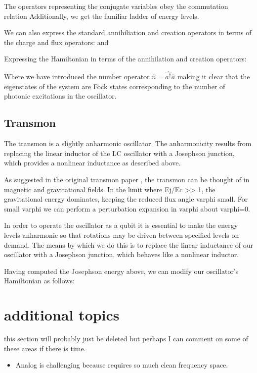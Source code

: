 The operators representing the conjugate variables obey the commutation relation
Additionally, we get the familiar ladder of energy levels.

We can also express the standard annihiliation and creation operators in terms of the charge and flux operators:
and

Expressing the Hamiltonian in terms of the annihilation and creation operators:

Where we have introduced the number operator $\hat{n} = \hat{a^\dagger} \hat{a}$ making it clear that the eigenstates of the system are Fock states corresponding to the number
of photonic excitations in the oscillator.

\subsection{Transmon}
The transmon is a slightly anharmonic oscillator.
The anharmonicity results from replacing the linear inductor of the LC oscillator with a Josephson junction, which provides a nonlinear inductance as described above.

As suggested in the original transmon paper , the transmon can be thought of in magnetic and gravitational fields.
In the limit where Ej/Ec >> 1, the gravitational energy dominates, keeping the reduced flux angle varphi small.
For small varphi we can perform a perturbation expansion in varphi about varphi=0.




In order to operate the oscillator as a qubit it is essential to make the energy levels anharmonic so that rotations may be driven between specified levels on demand.
The means by which we do this is to replace the linear inductance of our oscillator with a Josephson junction, which behaves like a nonlinear inductor.

Having computed the Josephson energy above, we can modify our oscillator's Hamiltonian as follows:











\section{additional topics}
this section will probably just be deleted but perhaps I can comment on some of these areas if there is time.
\begin{itemize}
    \item Analog is challenging because requires so much clean frequency space.
\end{itemize}

